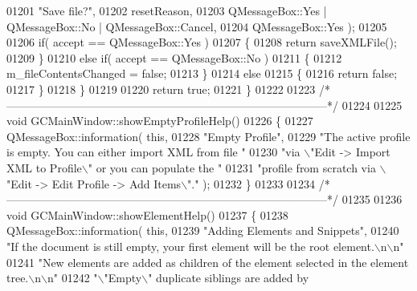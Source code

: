 \begin{DoxyCode}
{{{{{{01201                                                                  \textcolor{stringliteral}{"Save file?"},
01202                                                                  resetReason,
01203                                                                  
      QMessageBox::Yes | QMessageBox::No | QMessageBox::Cancel,
01204                                                                  
      QMessageBox::Yes );
01205 
01206     \textcolor{keywordflow}{if}( accept == QMessageBox::Yes )
01207     \{
01208       \textcolor{keywordflow}{return} saveXMLFile();
01209     \}
01210     \textcolor{keywordflow}{else} \textcolor{keywordflow}{if}( accept == QMessageBox::No )
01211     \{
01212       m\_fileContentsChanged = \textcolor{keyword}{false};
01213     \}
01214     \textcolor{keywordflow}{else}
01215     \{
01216       \textcolor{keywordflow}{return} \textcolor{keyword}{false};
01217     \}
01218   \}
01219 
01220   \textcolor{keywordflow}{return} \textcolor{keyword}{true};
01221 \}
01222 
01223 \textcolor{comment}{/*
      --------------------------------------------------------------------------------------*/}
01224 
01225 \textcolor{keywordtype}{void} GCMainWindow::showEmptyProfileHelp()
01226 \{
01227   QMessageBox::information( \textcolor{keyword}{this},
01228                             \textcolor{stringliteral}{"Empty Profile"},
01229                             \textcolor{stringliteral}{"The active profile is empty.  You can either
       import XML from file "}
01230                             \textcolor{stringliteral}{"via \(\backslash\)"Edit -> Import XML to Profile\(\backslash\)" or you can
       populate the "}
01231                             \textcolor{stringliteral}{"profile from scratch via \(\backslash\)"Edit -> Edit Profile ->
       Add Items\(\backslash\)"."} );
01232 \}
01233 
01234 \textcolor{comment}{/*
      --------------------------------------------------------------------------------------*/}
01235 
01236 \textcolor{keywordtype}{void} GCMainWindow::showElementHelp()
01237 \{
01238   QMessageBox::information( \textcolor{keyword}{this},
01239                             \textcolor{stringliteral}{"Adding Elements and Snippets"},
01240                             \textcolor{stringliteral}{"If the document is still empty, your first element
       will be the root element.\(\backslash\)n\(\backslash\)n"}
01241                             \textcolor{stringliteral}{"New elements are added as children of the element
       selected in the element tree.\(\backslash\)n\(\backslash\)n"}
01242                             \textcolor{stringliteral}{"\(\backslash\)"Empty\(\backslash\)" duplicate siblings are added by
}}}}}}}
\end{DoxyCode}
